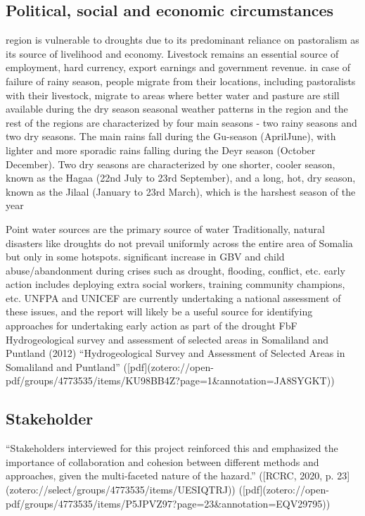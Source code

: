 {{\subsection{Political, social and economic circumstances}
region is vulnerable to droughts due to its predominant reliance on pastoralism as its source of livelihood and economy. Livestock remains an essential source of employment, hard currency, export earnings and government revenue.
in case of failure of rainy season, people migrate from their locations, including pastoralists with their livestock, migrate to areas where better water and pasture are still available during the dry season
seasonal weather patterns in the region and the rest of the regions are characterized by four main seasons - two rainy seasons and two dry seasons. The main rains fall during the Gu-season (AprilJune), with lighter and more sporadic rains falling during the Deyr season (October December). Two dry seasons are characterized by one shorter, cooler season, known as the Hagaa (22nd July to 23rd September), and a long, hot, dry season, known as the Jilaal (January to 23rd March), which is the harshest season of the year


Point water sources are the primary source of water
Traditionally, natural disasters like droughts do not prevail uniformly across the entire area of Somalia but only in some hotspots.
significant increase in GBV and child abuse/abandonment during crises such as drought, flooding, conflict, etc. early action includes deploying extra social workers, training community champions, etc. UNFPA and UNICEF are currently undertaking a national assessment of these issues, and the report will likely be a useful source for identifying approaches for undertaking early action as part of the drought FbF
Hydrogeological survey and assessment of selected areas in Somaliland and Puntland (2012)
“Hydrogeological Survey and Assessment of Selected Areas in Somaliland and Puntland” ([pdf](zotero://open-pdf/groups/4773535/items/KU98BB4Z?page=1&annotation=JA8SYGKT))




\subsection{Stakeholder}

“Stakeholders interviewed for this project reinforced this and emphasized the importance of collaboration and cohesion between different methods and approaches, given the multi-faceted nature of the hazard.” ([RCRC, 2020, p. 23](zotero://select/groups/4773535/items/UESIQTRJ)) ([pdf](zotero://open-pdf/groups/4773535/items/P5JPVZ97?page=23&annotation=EQV29795))

}}

